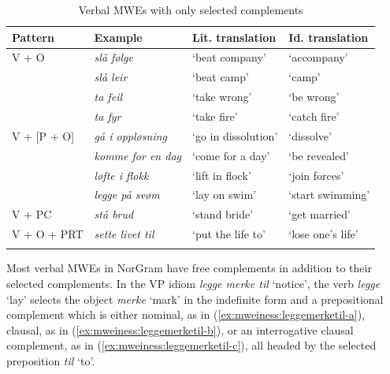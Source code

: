 \documentclass[output=paper]{langsci/langscibook}
\begin{document}
\begin{table}
  \begin{tabular}{llll}
    \lsptoprule
    Pattern & Example & Lit. translation & Id. translation\\
    \midrule
    V + O & \emph{slå følge} &  `beat company' &  `accompany' \\
    & \emph{slå leir} & `beat camp' &  `camp' \\
    & \emph{ta feil} & `take wrong' & `be wrong'  \\
    & \emph{ta fyr} & `take fire' &  `catch fire' \\ \hline
    V + [P + O] & \emph{gå i oppløsning} & `go in dissolution' & `dissolve' \\ 
    & \emph{komme for en dag} & `come for a day' & `be revealed' \\     
    & \emph{løfte i flokk} & `lift in flock' & `join forces' \\
    & \emph{legge på svøm} & `lay on swim' &  `start swimming' \\ \hline
    V + PC & \emph{stå brud} & `stand bride' & `get married' \\ \hline
    V + O + PRT & \emph{sette livet til} & `put the life to' & `lose one's life' \\
    \lspbottomrule
  \end{tabular}
  \caption{Verbal MWEs with only selected complements}
  \label{tab:mweiness:selected}
\end{table}

%
Most verbal MWEs in NorGram have free complements in addition to their selected complements. 
In the VP idiom \emph{legge merke til} `notice', the verb \emph{legge} `lay' selects the object \emph{merke} `mark' in the indefinite form and a prepositional complement which is either nominal, as in (\ref{ex:mweiness:leggemerketil-a}), clausal, as in (\ref{ex:mweiness:leggemerketil-b}), or an interrogative clausal complement, as in  (\ref{ex:mweiness:leggemerketil-c}), all headed by the selected preposition \emph{til} `to'.
\end{document}
